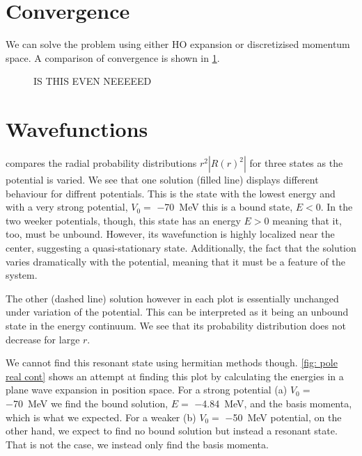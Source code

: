 \documentclass[../main/report.tex]{subfiles}
\begin{document}
\section{Convergence}
We can solve the problem using either HO expansion or discretizised momentum space. A comparison of convergence is shown in \cref{fig:HO vs mom}.
\begin{figure}
  \centering
  \caption{IS THIS EVEN NEEEEED}
  \label{fig:HO vs mom}
\end{figure}

\section{Wavefunctions}

 compares the radial probability distributions $r^2|R(r)^2|$ for three states as the potential is varied.
 We see that one solution (filled line) displays different behaviour for diffrent potentials. This is the state with the lowest energy and with a very strong potential, $V_0 =$ \SI{-70}{MeV} this is a bound state, $E<0$. In the two weeker potentials, though, this state has an energy $E>0$ meaning that it, too, must be unbound. 
However, its wavefunction is highly localized near the center, suggesting a quasi-stationary state. 
Additionally, the fact that the solution varies dramatically with the potential, meaning that it must be a feature of the system.
 
The other (dashed line) solution however in each plot is essentially unchanged under variation of the potential. 
This can be interpreted as it being an unbound state in the energy continuum. We see that its probability distribution does not decrease for large $r$.


We cannot find this resonant state using hermitian methods though.
\cref{fig: pole real cont} shows an attempt at finding this plot by calculating the energies in a plane wave expansion in position space.
For a strong potential (a) $V_0 =$ \SI{-70}{MeV} we find the bound solution, $E= $ \SI{-4.84}{MeV}, and the basis momenta, which is what we expected.
For a weaker (b) $V_0 =$ \SI{-50}{MeV} potential, on the other hand, we expect to find no bound solution but instead a resonant state. 
That is not the case, we instead only find the basis momenta.

\end{document}
